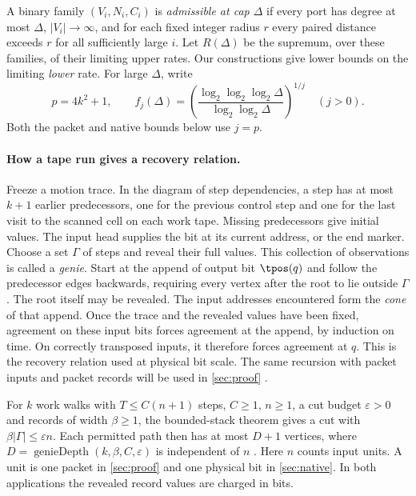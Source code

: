 A binary family $(V_i,N_i,C_i)$ is \emph{admissible at cap $\Delta$} if
every port has degree at most $\Delta$, $|V_i|\to\infty$, and for each
fixed integer radius $r$ every paired distance exceeds $r$ for all
sufficiently large $i$. Let $R(\Delta)$ be the supremum, over these
families, of their limiting upper rates. Our constructions give lower
bounds on the limiting \emph{lower} rate. For large $\Delta$, write
\[
 p=4k^2+1,\qquad
 f_j(\Delta)=\left(\frac{\log_2\log_2\log_2\Delta}
                         {\log_2\log_2\Delta}\right)^{1/j}\quad(j>0).
\]
Both the packet and native bounds below use $j=p$.

\paragraph{How a tape run gives a recovery relation.}
Freeze a motion trace. In the diagram of step dependencies, a step has
at most $k+1$ earlier predecessors, one for the previous control step
and one for the last visit to the scanned cell on each work tape. Missing predecessors
give initial values. The input head supplies the bit at its current
address, or the end marker. Choose a set $\Gamma$ of steps and reveal
their full values. This collection of observations is called a
\emph{genie}. Start at the append of output bit $\tpos(q)$ and follow
the predecessor edges backwards, requiring every vertex after the root to lie outside $\Gamma$. The root
itself may be revealed.
The input addresses encountered form the \emph{cone} of that append.
Once the trace and the revealed values have been fixed, agreement on
these input bits forces agreement at the append, by induction on time.
On correctly transposed inputs, it therefore forces agreement at $q$.
This is the recovery relation used at physical bit scale. The same
recursion with packet inputs and packet records will be used in
\cref{sec:proof} \cite[\S4]{PaperEleven}.

For $k$ work walks with $T\le C(n+1)$ steps, $C\ge1$, $n\ge1$, a cut
budget $\varepsilon>0$ and records of width $\beta\ge1$, the bounded-stack theorem gives a cut with
$\beta|\Gamma|\le\varepsilon n$. Each permitted path then has at most
$D+1$ vertices, where $D=\operatorname{genieDepth}(k,\beta,C,\varepsilon)$
is independent of $n$ \cite[Corollary~O(a)]{PaperFourteen}. Here $n$
counts input units. A unit is one packet in \cref{sec:proof} and one
physical bit in \cref{sec:native}. In both applications the revealed
record values are charged in bits.
